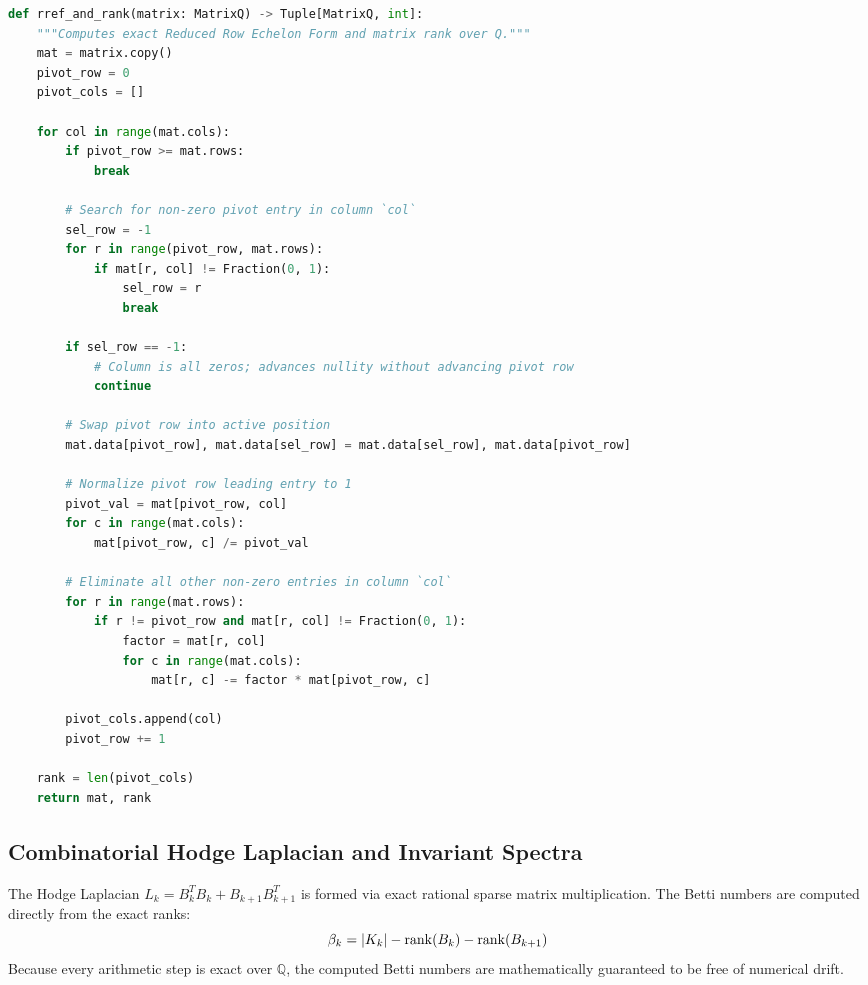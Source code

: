 \begin{lstlisting}[language=Python, caption={Exact Rational Reduced Row Echelon Form (RREF) Algorithm.}]
def rref_and_rank(matrix: MatrixQ) -> Tuple[MatrixQ, int]:
    """Computes exact Reduced Row Echelon Form and matrix rank over Q."""
    mat = matrix.copy()
    pivot_row = 0
    pivot_cols = []

    for col in range(mat.cols):
        if pivot_row >= mat.rows:
            break

        # Search for non-zero pivot entry in column `col`
        sel_row = -1
        for r in range(pivot_row, mat.rows):
            if mat[r, col] != Fraction(0, 1):
                sel_row = r
                break

        if sel_row == -1:
            # Column is all zeros; advances nullity without advancing pivot row
            continue

        # Swap pivot row into active position
        mat.data[pivot_row], mat.data[sel_row] = mat.data[sel_row], mat.data[pivot_row]

        # Normalize pivot row leading entry to 1
        pivot_val = mat[pivot_row, col]
        for c in range(mat.cols):
            mat[pivot_row, c] /= pivot_val

        # Eliminate all other non-zero entries in column `col`
        for r in range(mat.rows):
            if r != pivot_row and mat[r, col] != Fraction(0, 1):
                factor = mat[r, col]
                for c in range(mat.cols):
                    mat[r, c] -= factor * mat[pivot_row, c]

        pivot_cols.append(col)
        pivot_row += 1

    rank = len(pivot_cols)
    return mat, rank
\end{lstlisting}

\subsection{Combinatorial Hodge Laplacian and Invariant Spectra}
The Hodge Laplacian $L_k = B_k^T B_k + B_{k+1} B_{k+1}^T$ is formed via exact rational sparse matrix multiplication. The Betti numbers are computed directly from the exact ranks:
\begin{equation}
    \beta_k = |K_k| - \operatorname{rank}(B_k) - \operatorname{rank}(B_{k+1})
\end{equation}
Because every arithmetic step is exact over $\mathbb{Q}$, the computed Betti numbers are mathematically guaranteed to be free of numerical drift.


